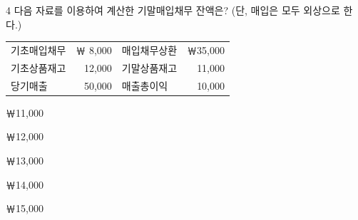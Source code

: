 \begin{question}{4}
다음 자료를 이용하여 계산한 기말매입채무 잔액은? (단, 매입은 모두 외상으로 한다.)
\begin{center}
\small
\begin{tabular}{|l r l r|}
\hline
기초매입채무 & ￦ 8,000 & 매입채무상환 & ￦35,000 \\
기초상품재고 & 12,000 & 기말상품재고 & 11,000 \\
당기매출 & 50,000 & 매출총이익 & 10,000 \\
\hline
\end{tabular}
\end{center}
\begin{choices}
  \item ￦11,000
  \item ￦12,000
  \item ￦13,000
  \item ￦14,000
  \item ￦15,000
\end{choices}
\end{question}
